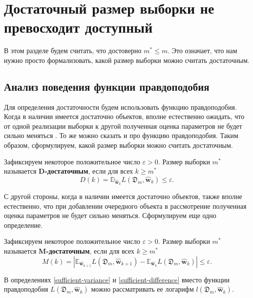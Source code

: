 \section{Достаточный размер выборки не превосходит доступный}\label{sec2}

В этом разделе будем считать, что достоверно $m^* \leqslant m$. Это означает, что нам нужно просто формализовать, какой размер выборки можно считать достаточным.

\subsection{Анализ поведения функции правдоподобия}

Для определения достаточности будем использовать функцию правдоподобия. Когда в наличии имеется достаточно объектов, вполне естественно ожидать, что от одной реализации выборки к другой полученная оценка параметров не будет сильно меняться \cite{Joseph1997, Joseph1995}. То же можно сказать и про функцию правдоподобия. Таким образом, сформулируем, какой размер выборки можно считать достаточным.

\begin{definition}
    \label{sufficient-variance}
    Зафиксируем некоторое положительное число $\varepsilon > 0$. Размер выборки $m^*$ называется \textbf{D-достаточным}, если для всех $k \geqslant m^*$
    \[ D(k) = \mathbb{D}_{\hat{\mathbf{w}}_{k}} L(\mathfrak{D}_m, \hat{\mathbf{w}}_{k}) \leqslant \varepsilon. \]
\end{definition}

С другой стороны, когда в наличии имеется достаточно объектов, также вполне естественно, что при добавлении очередного объекта в рассмотрение полученная оценка параметров не будет сильно меняться. Сформулируем еще одно определение.

\begin{definition}
    \label{sufficient-difference}
    Зафиксируем некоторое положительное число $\varepsilon > 0$. Размер выборки $m^*$ называется \textbf{M-достаточным}, если для всех $k \geqslant m^*$ 
    \[ M(k) = \left| \mathbb{E}_{\hat{\mathbf{w}}_{k+1}} L(\mathfrak{D}_m, \hat{\mathbf{w}}_{k+1}) - \mathbb{E}_{\hat{\mathbf{w}}_{k}} L(\mathfrak{D}_m, \hat{\mathbf{w}}_{k}) \right| \leqslant \varepsilon. \]
\end{definition}
\begin{note}
    В определениях \ref{sufficient-variance} и \ref{sufficient-difference} вместо функции правдоподобия $L(\mathfrak{D}_m, \hat{\mathbf{w}}_{k})$ можно рассматривать ее логарифм $l(\mathfrak{D}_m, \hat{\mathbf{w}}_{k})$.
\end{note}

